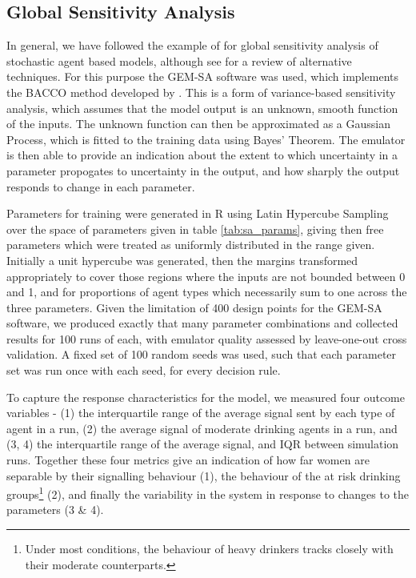 \subsection{Global Sensitivity Analysis}
\label{sub:sensitivity}
In general, we have followed the example of \cite{Bijak2013b} for global sensitivity analysis of stochastic agent based models, although see \citet{Thiele2014} for a review of alternative techniques. For this purpose the \ac{GEM-SA} software \citep{Kennedy} was used, which implements the \ac{BACCO} method developed by \citeauthor{Oakley2004} \citep{Oakley2002,Oakley2004,Dorresteijn2010}. This is a form of variance-based sensitivity analysis, which assumes that the model output is an unknown, smooth function of the inputs. The unknown function can then be approximated as a Gaussian Process, which is fitted to the training data using Bayes' Theorem. The emulator is then able to provide an indication about the extent to which uncertainty in a parameter propogates to uncertainty in the output, and how sharply the output responds to change in each parameter.

\begin{comment}

Justification for doing SA, point out the wide variety of places this gets used. Talk about uncertainty, briefly raise model discrepancy.

\end{comment}

Parameters for training were generated in R \citep{RTeam2014} using Latin Hypercube Sampling \citep{Carnell2012} over the space of parameters given in table \ref{tab:sa_params}, giving then free parameters which were treated as uniformly distributed in the range given. Initially a unit hypercube was generated, then the margins transformed appropriately to cover those regions where the inputs are not bounded between 0 and 1, and for proportions of agent types which necessarily sum to one across the three parameters. Given the limitation of 400 design points for the \ac{GEM-SA} software, we produced exactly that many parameter combinations and collected results for 100 runs of each, with emulator quality assessed by leave-one-out cross validation. A fixed set of 100 random seeds was used, such that each parameter set was run once with each seed, for every decision rule.

To capture the response characteristics for the model, we measured four outcome variables - (1) the interquartile range of the average signal sent by each type of agent in a run, (2) the average signal of moderate drinking agents in a run, and (3, 4) the interquartile range of the average signal, and \ac{IQR} between simulation runs. Together these four metrics give an indication of how far women are separable by their signalling behaviour (1), the behaviour of the at risk drinking groups\footnote{Under most conditions, the behaviour of heavy drinkers tracks closely with their moderate counterparts.} (2), and finally the variability in the system in response to changes to the parameters (3 \& 4).

